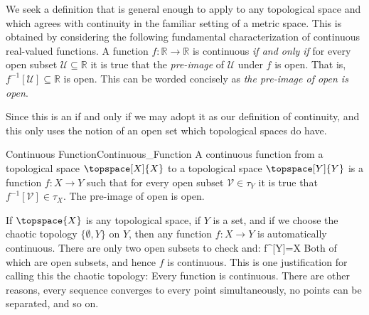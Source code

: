         \par\hfill\par
        \hfill
        \begin{minipage}[t]{0.50\textwidth}
            We seek a definition that is general enough to apply to any
            topological space and which agrees with continuity in the
            familiar setting of a metric space. This is obtained by
            considering the following fundamental characterization of
            continuous real-valued functions. A function
            $f:\mathbb{R}\rightarrow\mathbb{R}$ is continuous
            \textit{if and only if} for every open subset
            $\mathcal{U}\subseteq\mathbb{R}$ it is true that the
            \textit{pre-image} of $\mathcal{U}$ under $f$ is open. That
            is, $f^{\minus{1}}[\mathcal{U}]\subseteq\mathbb{R}$ is open.
            This can be worded concisely as
            \textit{the pre-image of open is open}.
        \end{minipage}
        \par\hfill\par
        Since this is an if and only if we may adopt it as our
        definition of continuity, and this only uses the notion of an
        open set which topological spaces do have.
        \begin{fdefinition}{Continuous Function}{Continuous_Function}
            A continuous function from a topological space
            $\topspace[X]{X}$ to a topological space $\topspace[Y]{Y}$
            is a function $f:X\rightarrow{Y}$ such that for every open
            subset $\mathcal{V}\in\tau_{Y}$ it is true that
            $f^{\minus{1}}[\mathcal{V}]\in\tau_{X}$. The pre-image of
            open is open.
        \end{fdefinition}
        \begin{example}
            If $\topspace{X}$ is any topological space, if
            $Y$ is a set, and if we choose the chaotic topology
            $\{\emptyset,Y\}$ on $Y$, then any function
            $f:X\rightarrow{Y}$ is automatically continuous. There are
            only two open subsets to check and:
                        {f^{}[Y]=X}
            Both of which are open subsets, and hence $f$ is continuous.
            This is one justification for calling this the chaotic
            topology: Every function is continuous. There are other
            reasons, every sequence converges to every point
            simultaneously, no points can be separated, and so on.
        \end{example}
